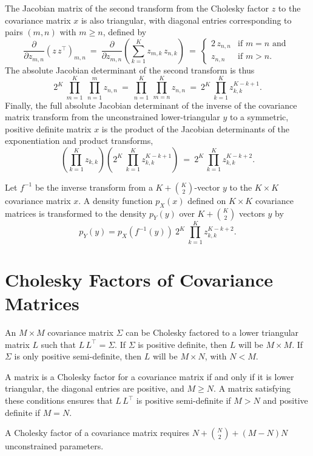 The Jacobian matrix of the second transform from the Cholesky factor $z$ to
the covariance matrix $x$ is also triangular, with diagonal entries
corresponding to pairs $(m,n)$ with $m \geq n$, defined by
\[
\frac{\partial}{\partial z_{m,n}}
\left( z \, z^{\top} \right)_{m,n}
\ = \
\frac{\partial}{\partial z_{m,n}}
\left( \sum_{k=1}^K z_{m,k} \, z_{n,k} \right)
\ = \
\left\{
\begin{array}{cl}
2 \, z_{n,n} & \mbox{if } m = n \mbox{ and }
\\[4pt]
z_{n,n} & \mbox{if } m > n.
\end{array}
\right.
\]
%
The absolute Jacobian determinant of the second transform is thus
\[
2^{K} \ \prod_{m = 1}^{K} \ \prod_{n=1}^{m} z_{n,n}
\ = \
\prod_{n=1}^K \ \prod_{m=n}^K z_{n,n}
\ = \
2^{K} \ \prod_{k=1}^K z_{k,k}^{K - k + 1}.
\]
Finally, the full absolute Jacobian determinant of the inverse
of the covariance matrix transform from the unconstrained lower-triangular
$y$ to a symmetric, positive definite matrix $x$ is the product of the
Jacobian determinants of the exponentiation and product transforms,
\[
\left( \prod_{k=1}^K z_{k,k} \right)
\left(
2^{K} \ \prod_{k=1}^K z_{k,k}^{K - k + 1}
\right)
\ = \
2^K
\, \prod_{k=1}^K z_{k,k}^{K-k+2}.
\]

Let $f^{-1}$ be the inverse transform from a $K + \binom{K}{2}$-vector
$y$ to the $K \times K$ covariance matrix $x$.  A density function
$p_X(x)$ defined on $K \times K$ covariance matrices is transformed to
the density $p_Y(y)$ over $K + \binom{K}{2}$ vectors $y$ by
\[
p_Y(y) = p_X(f^{-1}(y)) \ 2^K \ \prod_{k=1}^K z_{k,k}^{K-k+2}.
\]

\section{Cholesky Factors of Covariance Matrices}

An $M \times M$ covariance matrix $\Sigma$ can be Cholesky factored to
a lower triangular matrix $L$ such that $L\,L^{\top} = \Sigma$.  If
$\Sigma$ is positive definite, then $L$ will be $M \times M$.  If
$\Sigma$ is only positive semi-definite, then $L$ will be $M \times N$,
with $N < M$.

A matrix is a Cholesky factor for a covariance matrix if and only if
it is lower triangular, the diagonal entries are positive, and $M \geq
N$.  A matrix satisfying these conditions ensures that $L \,
L^{\top}$ is positive semi-definite if $M > N$ and positive definite
if $M = N$.

A Cholesky factor of a covariance matrix requires $N + \binom{N}{2} +
(M - N)N$ unconstrained parameters.

